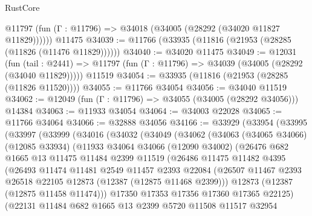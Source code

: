 \begin{lexlean}{RustCore}
\begin{coremodule}
      @11797 (fun (Γ : @11796) => @34018 (@34005 (@28292 (@34020 @11827 @11829))))))
    @11475
@34039 := @11766 (@33935 (@11816 (@21953 (@28285 (@11826 (@11476 @11829))))))
@34040 := @34020 @11475
@34049 := @12031
    (fun (tail : @2441) => @11797 (fun (Γ : @11796) => @34039 (@34005 (@28292 (@34040 @11829)))))
    @11519
@34054 := @33935 (@11816 (@21953 (@28285 (@11826 @11520))))
@34055 := @11766 @34054
@34056 := @34040 @11519
@34062 := @12049 (fun (Γ : @11796) => @34055 (@34005 (@28292 @34056))) @14384
@34063 := @11933 @34054
@34064 := @34003 @22028
@34065 := @11766 @34064
@34066 := @32888 @34056
@34166 := @33929
    (@33954
      (@33995
        (@33997
          (@33999
            (@34016
              (@34032
                (@34049
                  (@34062
                    (@34063
                      (@34065 @34066)
                      (@12085 @33934)
                      (@11933
                        @34064
                        @34066
                        (@12090 @34002)
                        (@26476
                          @682
                          @1665
                          @13
                          @11475
                          @11484
                          @2399
                          @11519
                          (@26486
                            @11475
                            @11482
                            @4395
                            (@26493
                              @11474
                              @11481
                              @2549
                              @11457
                              @2393
                              @22084
                              (@26507
                                @11467
                                @2393
                                @26518
                                @22105
                                @12873
                                (@12387 (@12875 @11468 @2399)))
                              @12873
                              (@12387 (@12875 @11458 @11474)))
                            @17350
                            @17353
                            @17356
                            @17360
                            @17365
                            @22125)
                          (@22131
                            @11484
                            @682
                            @1665
                            @13
                            @2399
                            @5720
                            @11508
                            @11517
                            @32954

\end{coremodule}
\end{lexlean}
